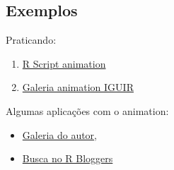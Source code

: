 \subsection{Exemplos}

\begin{frame}

  Praticando:
  \begin{enumerate}
  \item \href{run:./R/animation/animation.R}{R Script animation}
  \item \href{run:./animation/animation.html}{Galeria animation IGUIR}
  \end{enumerate}

  Algumas aplicações com o animation:
  \begin{itemize}
  \item
    \href{http://vis.supstat.com/categories.html\#animation-ref}{Galeria
      do autor},
  \item \href{http://www.r-bloggers.com/?s=animation}{Busca no R
      Bloggers}
  \end{itemize}

\end{frame}
